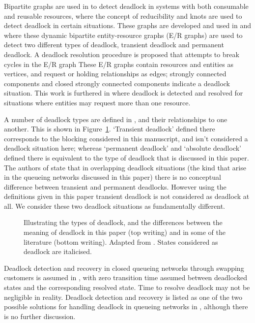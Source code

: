 \documentclass{article}
\numberwithin{equation}{section}
\begin{document}
Bipartite graphs are used in \cite{holt72} to detect deadlock in systems with
both consumable and reusable resources, where the concept of reducibility and
knots are used to detect deadlock in certain situations.
These graphs are developed and used in \cite{deuermeyeretal97} and
\cite{venkateshsmith03} where these dynamic bipartite entity-resource graphs
(E/R graphs) are used to detect two different types of deadlock, transient
deadlock and permanent deadlock. A deadlock resolution procedure is proposed
that attempts to break cycles in the E/R graph
These E/R graphs contain resources and entities as vertices, and request or
holding relationships as edges; strongly connected components and closed
strongly connected components indicate a deadlock situation.
This work is furthered in \cite{venkateshetal98} where deadlock is detected
and resolved for situations where entities may request more than one resource.

A number of deadlock types are defined in \cite{venkateshetal98}, and their
relationships to one another.
This is shown in Figure~\ref{fig:deadlocktypes}.
`Transient deadlock' defined there corresponds to the blocking considered in
this manuscript, and isn't considered a deadlock situation here; whereas
`permanent deadlock' and `absolute deadlock' defined there is equivalent to
the type of deadlock that is discussed in this paper.
The authors of \cite{venkateshetal98} state that in overlapping deadlock
situations (the kind that arise in the queueing networks discussed in this
paper) there is no conceptual difference between transient and permanent
deadlocks.
However using the definitions given in this paper transient deadlock is not
considered as deadlock at all.
We consider these two deadlock situations as fundamentally different.

\begin{figure}[!htbp]
  \begin{center}
  
  \end{center}
  \caption{Illustrating the types of deadlock, and the differences between the
  meaning of deadlock in this paper (top writing) and in some of the
  literature (bottom writing). Adapted from \cite{venkateshetal98}.
  States considered as deadlock are italicised.}
  \label{fig:deadlocktypes}
\end{figure}

Deadlock detection and recovery in closed queueing networks through swapping
customers is assumed in \cite{perrosetal88}, with zero transition time assumed
between deadlocked states and the corresponding resolved state.
Time to resolve deadlock may not be negligible in reality.
Deadlock detection and recovery is listed as one of the two possible solutions
for handling deadlock in queueing networks in \cite{akyildiz89}, although
there is no further discussion.
\end{document}

